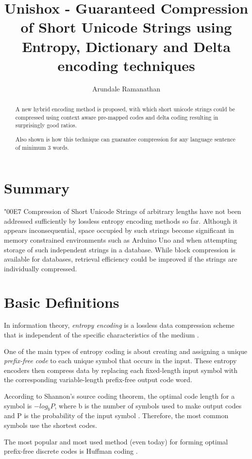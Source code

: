 \documentclass[]{article}
\title{Unishox - Guaranteed Compression of Short Unicode Strings using Entropy, Dictionary and Delta encoding techniques}
\author{Arundale Ramanathan}
\begin{document}
\maketitle

\begin{abstract}
A new hybrid encoding method is proposed, with which short unicode strings could be compressed using context aware pre-mapped codes and delta coding resulting in surprisingly good ratios.

Also shown is how this technique can guarantee compression for any language sentence of minimum 3 words.
\end{abstract}

\section{Summary}

\char"00E7 Compression of Short Unicode Strings of arbitrary lengths have not been addressed sufficiently by lossless entropy encoding methods so far.  Although it appears inconsequential, space occupied by such strings become significant in memory constrained environments such as Arduino Uno and when attempting storage of such independent strings in a database. While block compression is available for databases, retrieval efficiency could be improved if the strings are individually compressed.

\section{Basic Definitions}

In information theory, \emph{entropy encoding} is a lossless data compression scheme that is independent of the specific characteristics of the medium \cite{1}.

One of the main types of entropy coding is about creating and assigning a unique \emph{prefix-free code} to each unique symbol that occurs in the input. These entropy encoders then compress data by replacing each fixed-length input symbol with the corresponding variable-length prefix-free output code word.

According to Shannon's source coding theorem, the optimal code length for a symbol is $-log_bP$, where b is the number of symbols used to make output codes and P is the probability of the input symbol \cite{2}. Therefore, the most common symbols use the shortest codes.

The most popular and most used method (even today) for forming optimal prefix-free discrete codes is Huffman coding \cite{3}.
\end{document}
